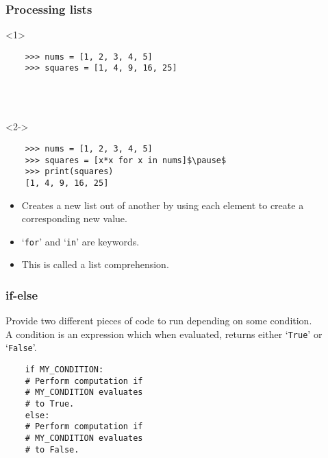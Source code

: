 \documentclass[notes]{beamer}
\begin{document}
\begin{frame}[fragile]
    \frametitle{Processing lists}
    
    \begin{onlyenv}<1>
    \begin{lstlisting}
    >>> nums = [1, 2, 3, 4, 5]
    >>> squares = [1, 4, 9, 16, 25]
    \end{lstlisting}
    
    ~ \\
    ~ \\

    \end{onlyenv}
    
    \pause
    
    \begin{onlyenv}<2->
    \begin{lstlisting}
    >>> nums = [1, 2, 3, 4, 5]
    >>> squares = [x*x for x in nums]$\pause$
    >>> print(squares)
    [1, 4, 9, 16, 25]
    \end{lstlisting}
    \end{onlyenv}
    
    \pause
    
    \begin{itemize}
        \item Creates a new list out of another by using each element to create a corresponding new value.
        \item `\lstinline|for|' and `\lstinline|in|' are keywords.
        \item This is called a \colorbox{jargonbg}{list comprehension}.
    \end{itemize}
\end{frame}


\begin{frame}[fragile]
    \frametitle{if-else}
    
    Provide two different pieces of code to run depending on some condition.\\
    \pause
    A condition is an expression which when evaluated, returns either `\lstinline|True|' or `\lstinline|False|'.
    
    \pause  
    \begin{lstlisting}
    if MY_CONDITION:
    # Perform computation if
    # MY_CONDITION evaluates
    # to True.
    else:
    # Perform computation if
    # MY_CONDITION evaluates
    # to False.
    \end{lstlisting}
\end{frame}
\end{document}
